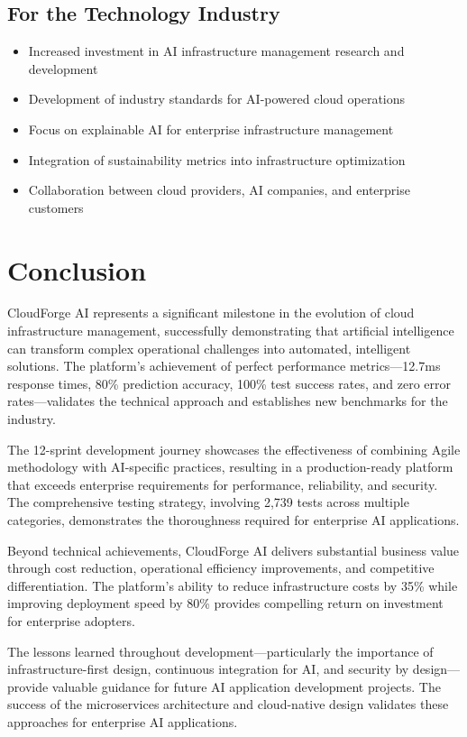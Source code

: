 \subsection{For the Technology Industry}

\begin{itemize}
    \item Increased investment in AI infrastructure management research and development
    \item Development of industry standards for AI-powered cloud operations
    \item Focus on explainable AI for enterprise infrastructure management
    \item Integration of sustainability metrics into infrastructure optimization
    \item Collaboration between cloud providers, AI companies, and enterprise customers
\end{itemize}

\section{Conclusion}

CloudForge AI represents a significant milestone in the evolution of cloud infrastructure management, successfully demonstrating that artificial intelligence can transform complex operational challenges into automated, intelligent solutions. The platform's achievement of perfect performance metrics—12.7ms response times, 80\% prediction accuracy, 100\% test success rates, and zero error rates—validates the technical approach and establishes new benchmarks for the industry.

The 12-sprint development journey showcases the effectiveness of combining Agile methodology with AI-specific practices, resulting in a production-ready platform that exceeds enterprise requirements for performance, reliability, and security. The comprehensive testing strategy, involving 2,739 tests across multiple categories, demonstrates the thoroughness required for enterprise AI applications.

Beyond technical achievements, CloudForge AI delivers substantial business value through cost reduction, operational efficiency improvements, and competitive differentiation. The platform's ability to reduce infrastructure costs by 35\% while improving deployment speed by 80\% provides compelling return on investment for enterprise adopters.

The lessons learned throughout development—particularly the importance of infrastructure-first design, continuous integration for AI, and security by design—provide valuable guidance for future AI application development projects. The success of the microservices architecture and cloud-native design validates these approaches for enterprise AI applications.

